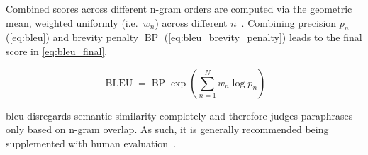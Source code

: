 Combined scores across different n-gram orders are computed via the geometric mean, weighted uniformly (i.e.\ $w_n$) across different $n$~\citep{papineni_bleu_2001,banerjee_METEOR_2005}.
Combining precision $p_n$ (\autoref{eq:bleu}) and brevity penalty $\operatorname{BP}$ (\autoref{eq:bleu_brevity_penalty}) leads to the final score in \autoref{eq:bleu_final}.

\begin{equation}
    \operatorname{BLEU} = \operatorname{BP}  \exp\left(\sum_{n=1}^{N} w_n  \log p_n\right)
\label{eq:bleu_final}
\end{equation}

\ac{bleu} disregards semantic similarity completely and therefore judges paraphrases only based on n-gram overlap. 
As such, it is generally recommended being supplemented with human evaluation~\citep{zhou_paraphrase_2021}.





